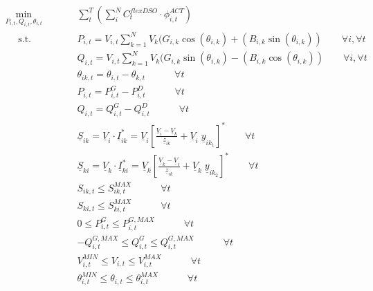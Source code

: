 \begin{subequations}
\begin{alignat}{2}
&\!\min_{P_{i,t}, Q_{i,t}, \theta_{i,t}}  &\qquad& \sum_{t}^{T} \left( \sum_{i}^{N} C_t^{flexDSO} \cdot \phi_{i,t}^{ACT} \right) \label{eq:optProb}\\ 
&\phantom{Mi} \text{s.t.} &      & P_{i,t} = V_{i,t} \sum_{k=1}^{N} V_{k} (G_{i,k} \cos(\theta_{i,k}) + (B_{i,k} \sin(\theta_{i,k})) \qquad \forall i,\forall t \label{eq:activepowernodalbalance} \\ 
&				   &      & Q_{i,t} = V_{i,t} \sum_{k=1}^{N} V_{k} (G_{i,k} \sin(\theta_{i,k}) - (B_{i,k} \cos(\theta_{i,k})) \qquad \forall i,\forall t \label{eq:reactivepowernodalbalance} \\
&                  &      & \theta_{ik,t} = \theta_{i,t} - \theta_{k,t} \quad   \qquad  \forall t  \label{eq:voltageangle} \\
&                  &      & P_{i,t} = P_{i,t}^{G} - P_{i,t}^{D}  \quad   \qquad  \forall t  \label{eq:Pi} \\
&                  &      & Q_{i,t} = Q_{i,t}^{G} - Q_{i,t}^{D}  \quad   \qquad  \forall t  \label{eq:Qi} \\
&                  &      & \underline{S}_{ik} = \underline{V}_{i} \cdot \underline{I}_{ik}^{*} = \underline{V}_{i} \left[ \frac{\underline{V}_{i} - \underline{V}_{k}}{\underline{z}_{ik}} + \underline{V}_{i} \; \underline{y}_{ik_1} \right]^{*}   \qquad  \forall t  \label{eq:apparentflowlineik} \\
&                  &      & \underline{S}_{ki} = \underline{V}_{k} \cdot \underline{I}_{ki}^{*} = \underline{V}_{k} \left[ \frac{\underline{V}_{k} - \underline{V}_{i}}{\underline{z}_{ik}} + \underline{V}_{k} \;  \underline{y}_{ik_2} \right]^{*}   \qquad  \forall t  \label{eq:apparentflowlineki} \\
&                  &      &  S_{ik,t} \leq S_{ik,t}^{MAX}  \quad   \qquad  \forall t  \label{eq:Siklimit} \\
&                  &      &  S_{ki,t} \leq S_{ki,t}^{MAX}  \quad   \qquad  \forall t  \label{eq:Skilimit} \\ 
&                  &      &  0 \leq P_{i,t}^{G} \leq P_{i,t}^{G,MAX}  \quad   \qquad  \forall t  \label{eq:genactivepower} \\
&                  &      &  - Q_{i,t}^{G,MAX} \leq Q_{i,t}^{G} \leq Q_{i,t}^{G,MAX}  \quad   \qquad  \forall t \label{eq:genreactivepower} \\
&                  &      &  V_{i,t}^{MIN} \leq V_{i,t} \leq V_{i,t}^{MAX}  \quad   \qquad  \forall t \label{eq:voltagelimit} \\
&                  &      & \theta_{i,t}^{MIN} \leq \theta_{i,t}  \leq \theta_{i,t}^{MAX} \quad   \qquad  \forall t  \label{eq:voltageangle}
\end{alignat}
\end{subequations}


